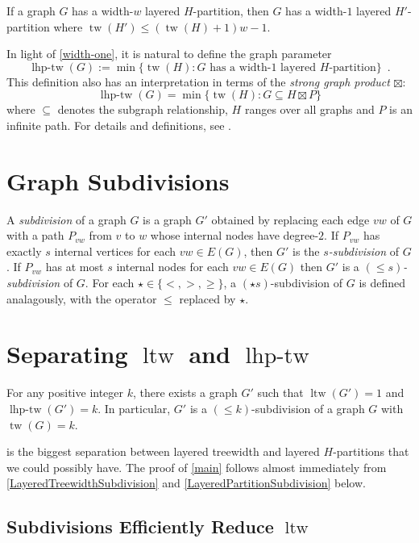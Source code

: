 \documentclass[kpfonts]{patmorin}
\DeclareMathOperator{\tw}{tw}
\DeclareMathOperator{\ltw}{ltw}
\DeclareMathOperator{\lhptw}{lhp-tw}
\begin{document}
\begin{lem}\cite{dujmovic.joret.ea:planar}\label{width-one}
    If a graph $G$ has a width-$w$ layered $H$-partition, then $G$ has a width-$1$ layered $H'$-partition where $\tw(H')\le (\tw(H)+1)w-1$.
\end{lem}

In light of \cref{width-one}, it is natural to define the graph parameter
\[
    \lhptw(G):= \min\{\tw(H): \text{$G$ has a width-$1$ layered $H$-partition}\} \enspace .
\]
This definition also has an interpretation in terms of the \emph{strong graph product} $\boxtimes$:
\[
    \lhptw(G)=\min\{\tw(H) : G\subseteq H\boxtimes P \}
\]
where $\subseteq$ denotes the subgraph relationship, $H$ ranges over all graphs and $P$ is an infinite path. For details and definitions, see \citet{dujmovic.joret.ea:planar}.

\section{Graph Subdivisions}

A \emph{subdivision} of a graph $G$ is a graph $G'$ obtained by replacing each edge $vw$ of $G$ with a path $P_{vw}$ from $v$ to $w$ whose internal nodes have degree-$2$.  If $P_{vw}$ has exactly $s$ internal vertices for each $vw\in E(G)$, then $G'$ is the \emph{$s$-subdivision} of $G$.  If $P_{vw}$ has at most $s$ internal nodes for each $vw\in E(G)$ then $G'$ is a \emph{$(\le\!\!s)$-subdivision} of $G$.  For each $\star\in\{<,>,\ge\}$, a $(\star s)$-subdivision of $G$ is defined analagously, with the operator $\le$ replaced by $\star$.

\section{Separating $\ltw$ and $\lhptw$}

\begin{thm}\label{main}
  For any positive integer $k$, there exists a graph $G'$ such that $\ltw(G')=1$ and $\lhptw(G')=k$.  In particular, $G'$ is a $(\le\!\!k)$-subdivision of a graph $G$ with $\tw(G)=k$.
\end{thm}

 is the biggest separation between layered treewidth and layered $H$-partitions that we could possibly have.  The proof of \cref{main} follows almost immediately from \cref{LayeredTreewidthSubdivision} and \cref{LayeredPartitionSubdivision} below.


\subsection{Subdivisions Efficiently Reduce $\ltw$}
\end{document}

